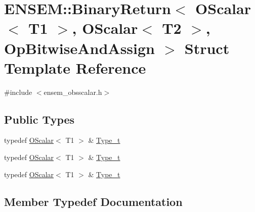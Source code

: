 \hypertarget{structENSEM_1_1BinaryReturn_3_01OScalar_3_01T1_01_4_00_01OScalar_3_01T2_01_4_00_01OpBitwiseAndAssign_01_4}{}\section{E\+N\+S\+EM\+:\+:Binary\+Return$<$ O\+Scalar$<$ T1 $>$, O\+Scalar$<$ T2 $>$, Op\+Bitwise\+And\+Assign $>$ Struct Template Reference}
\label{structENSEM_1_1BinaryReturn_3_01OScalar_3_01T1_01_4_00_01OScalar_3_01T2_01_4_00_01OpBitwiseAndAssign_01_4}


{\ttfamily \#include $<$ensem\+\_\+obsscalar.\+h$>$}

\subsection*{Public Types}
\begin{DoxyCompactItemize}
\item 
typedef \mbox{\hyperlink{classENSEM_1_1OScalar}{O\+Scalar}}$<$ T1 $>$ \& \mbox{\hyperlink{structENSEM_1_1BinaryReturn_3_01OScalar_3_01T1_01_4_00_01OScalar_3_01T2_01_4_00_01OpBitwiseAndAssign_01_4_a113164aa69cac863b97d72236eb744cb}{Type\+\_\+t}}
\item 
typedef \mbox{\hyperlink{classENSEM_1_1OScalar}{O\+Scalar}}$<$ T1 $>$ \& \mbox{\hyperlink{structENSEM_1_1BinaryReturn_3_01OScalar_3_01T1_01_4_00_01OScalar_3_01T2_01_4_00_01OpBitwiseAndAssign_01_4_a113164aa69cac863b97d72236eb744cb}{Type\+\_\+t}}
\item 
typedef \mbox{\hyperlink{classENSEM_1_1OScalar}{O\+Scalar}}$<$ T1 $>$ \& \mbox{\hyperlink{structENSEM_1_1BinaryReturn_3_01OScalar_3_01T1_01_4_00_01OScalar_3_01T2_01_4_00_01OpBitwiseAndAssign_01_4_a113164aa69cac863b97d72236eb744cb}{Type\+\_\+t}}
\end{DoxyCompactItemize}


\subsection{Member Typedef Documentation}
\mbox{\label{structENSEM_1_1BinaryReturn_3_01OScalar_3_01T1_01_4_00_01OScalar_3_01T2_01_4_00_01OpBitwiseAndAssign_01_4_a113164aa69cac863b97d72236eb744cb}} 
